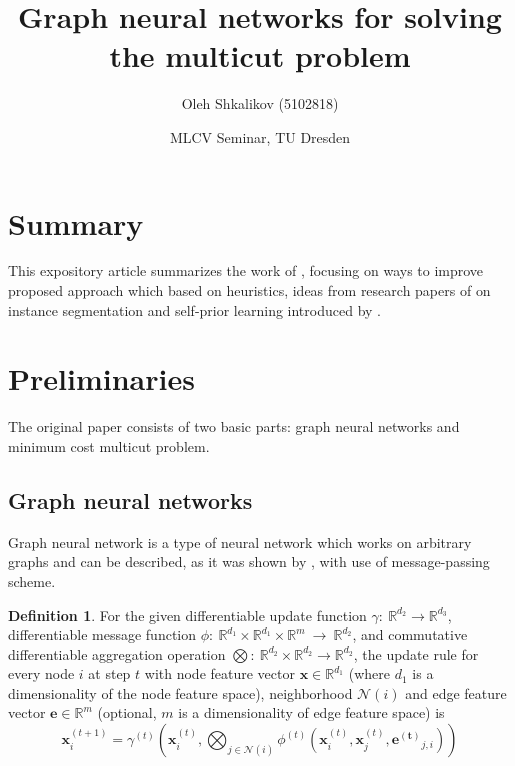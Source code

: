 \documentclass[10pt, twocolumn, a4paper]{article}
\theoremstyle{definition}
\newtheorem{definition}{Definition}
\begin{document}
\author{Oleh Shkalikov (5102818)}
\title{\bf\Large Graph neural networks for solving the multicut problem}
\date{MLCV Seminar, TU Dresden}

\twocolumn[
    \begin{@twocolumnfalse}
        \maketitle

        \vspace{7ex}
    \end{@twocolumnfalse}
]

\section{Summary}

This expository article summarizes the work of \citet{jung2022learning}, focusing on
ways to improve proposed approach which based on heuristics, ideas from
research papers of \citet{chen2019instance} on instance segmentation and self-prior
learning introduced by \citet{Hanocka2020p2m}.

\section{Preliminaries}

The original paper consists of two basic parts: graph neural networks and
minimum cost multicut problem.

\subsection{Graph neural networks}
Graph neural network is a type of neural network which works on arbitrary graphs and can be
described, as it was shown by \citet{gilmer2017neural}, with use of message-passing scheme.

\begin{definition}
    For the given differentiable update function $\gamma:~\mathbb{R}^{d_2} \to \mathbb{R}^{d_3}$,
    differentiable message function $\phi:~\mathbb{R}^{d_1} \times \mathbb{R}^{d_1} \times \mathbb{R}^{m}~\to~\mathbb{R}^{d_2}$, and
    commutative differentiable aggregation operation $\bigotimes:~\mathbb{R}^{d_2} \times \mathbb{R}^{d_2} \to \mathbb{R}^{d_2}$, the update rule for every
    node $i$ at step $t$ with node feature vector $\mathbf{x} \in \mathbb{R}^{d_1}$ (where $d_{1}$ is a dimensionality
    of the node feature space), neighborhood $\mathcal{N}(i)$ and
    edge feature vector $\mathbf{e} \in \mathbb{R}^m$ (optional, $m$ is a dimensionality of edge feature space) is
    \[
        \mathbf{x}_i^{(t+1)} = \gamma^{(t)} \left(\mathbf{x}_i^{(t)},
        \bigotimes_{j \in \mathcal{N}(i)} \phi^{(t)} \left(\mathbf{x}^{(t)}_i,
        \mathbf{x}^{(t)}_j, \mathbf{e^{(t)}}_{j, i} \right) \right)
    \]
\end{definition}
\end{document}
